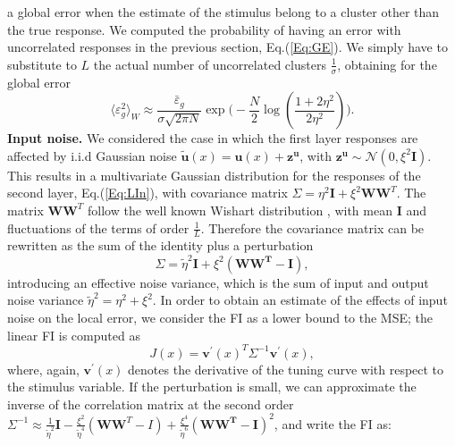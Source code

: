 \documentclass[a4paper]{article}%
\begin{document}
a global error when the estimate of the stimulus belong to a cluster other
than the true response. We computed the probability of having an error with
uncorrelated responses in the previous section, Eq.(\ref{Eq:GE}). We simply
have to substitute to $L$ the actual number of uncorrelated clusters $\frac
{1}{\sigma}$, obtaining for the global error
\begin{equation}
\langle\varepsilon_{g}^{2}\rangle_{W} \approx\frac{\bar{\varepsilon}_{g}%
}{\sigma\sqrt{2\pi N}} \exp{\Big(-\frac{N}{2} \log(\frac{1+2\eta^{2}}%
{2\eta^{2}})\Big)}.
\end{equation}
\newline\newline\textbf{Input noise.} We considered the case in which the
first layer responses are affected by i.i.d Gaussian noise $\mathbf{\tilde
u}(x) = \mathbf{u}(x) + \mathbf{z^{u}} $, with $\mathbf{z^{u}} \sim
\mathcal{N}(0,\xi^{2}\mathbf{I})$. This results in a multivariate Gaussian
distribution for the responses of the second layer, Eq.(\ref{Eq:LIn}), with
covariance matrix $\Sigma= \eta^{2} \mathbf{I} + \xi^{2} \mathbf{W}%
\mathbf{W}^{T}.$ The matrix $\mathbf{W}\mathbf{W}^{T}$ follow the well known
Wishart distribution \cite{Livan2017IntroductionPractice}, with mean
$\mathbf{I}$ and fluctuations of the terms of order $\frac{1}{L}$. Therefore
the covariance matrix can be rewritten as the sum of the identity plus a
perturbation
\begin{equation}
\Sigma= \tilde\eta^{2} \mathbf{I} + \xi^{2}(\mathbf{WW^{T} -I}),
\end{equation}
introducing an effective noise variance, which is the sum of input and output
noise variance $\tilde\eta^{2} = \eta^{2} + \xi^{2} $. In order to obtain an
estimate of the effects of input noise on the local error, we consider the FI
as a lower bound to the MSE; the linear FI is computed as
\begin{equation}
J(x) = \mathbf{v^{\prime}}(x)^{T} \Sigma^{-1}\mathbf{v^{\prime}}(x),
\end{equation}
where, again, $\mathbf{v^{\prime}}(x)$ denotes the derivative of the tuning
curve with respect to the stimulus variable. If the perturbation is small, we
can approximate the inverse of the correlation matrix at the second order
\newline$\Sigma^{-1} \approx\frac{1}{\tilde\eta^{2}} \mathbf{I} - \frac
{\xi^{2}}{\tilde\eta^{4}} (\mathbf{W}\mathbf{W}^{T}-I) + \frac{\xi^{4}}%
{\tilde\eta^{6}}(\mathbf{WW^{T}}-\mathbf{I})^{2} $, and write the FI as:%
\end{document}
